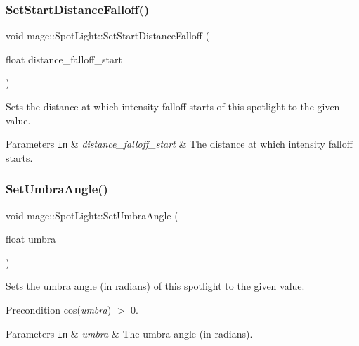 \subsubsection{\texorpdfstring{Set\+Start\+Distance\+Falloff()}{SetStartDistanceFalloff()}}
{\footnotesize\ttfamily void mage\+::\+Spot\+Light\+::\+Set\+Start\+Distance\+Falloff (\begin{DoxyParamCaption}\item[{float}]{distance\+\_\+falloff\+\_\+start }\end{DoxyParamCaption})\hspace{0.3cm}{\ttfamily [noexcept]}}

Sets the distance at which intensity falloff starts of this spotlight to the given value.


\begin{DoxyParams}[1]{Parameters}
\mbox{\tt in}  & {\em distance\+\_\+falloff\+\_\+start} & The distance at which intensity falloff starts. \\
\hline
\end{DoxyParams}
\hypertarget{classmage_1_1_spot_light_a2941a409b850fe341c203c0189eae636}{}\label{classmage_1_1_spot_light_a2941a409b850fe341c203c0189eae636} 
\subsubsection{\texorpdfstring{Set\+Umbra\+Angle()}{SetUmbraAngle()}}
{\footnotesize\ttfamily void mage\+::\+Spot\+Light\+::\+Set\+Umbra\+Angle (\begin{DoxyParamCaption}\item[{float}]{umbra }\end{DoxyParamCaption})\hspace{0.3cm}{\ttfamily [noexcept]}}

Sets the umbra angle (in radians) of this spotlight to the given value.

\begin{DoxyPrecond}{Precondition}
cos({\itshape umbra}) $>$ 0. 
\end{DoxyPrecond}

\begin{DoxyParams}[1]{Parameters}
\mbox{\tt in}  & {\em umbra} & The umbra angle (in radians). \\
\hline
\end{DoxyParams}
\hypertarget{classmage_1_1_spot_light_a83035abee0050acdca47b1f95b30a793}{}\label{classmage_1_1_spot_light_a83035abee0050acdca47b1f95b30a793} 
